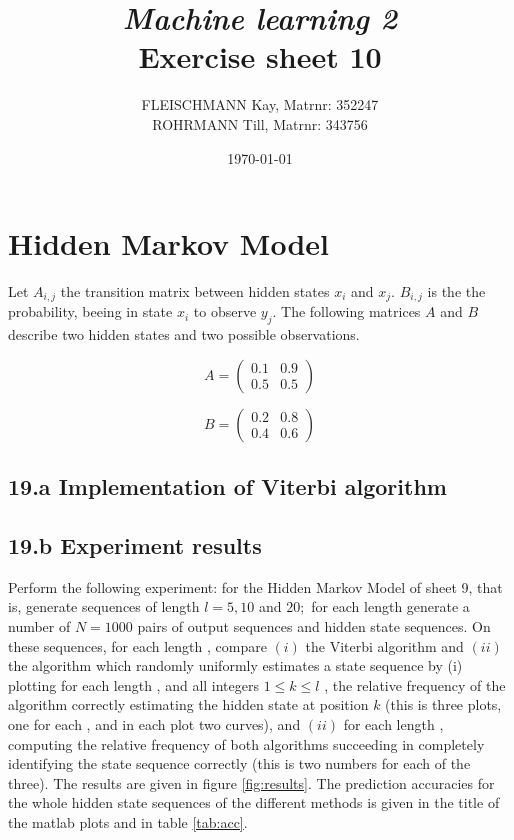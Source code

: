 \documentclass[a4paper, 12pt, titlepage]{article}
\title
{{\em Machine learning 2}\\
Exercise sheet 10}
\author{FLEISCHMANN Kay, Matrnr: 352247\\
	ROHRMANN Till, Matrnr: 343756}
\date{\today}
\begin{document}
\maketitle
\section*{Hidden Markov Model}

Let $A_{i,j}$ the transition matrix between hidden states $x_i$ and $x_j$. $B_{i,j}$ is the the probability, beeing in state $x_i$ to observe $y_j$.
The following matrices $A$ and $B$ describe two hidden states and two possible observations.

\[
A= 
 \begin{pmatrix}
  0.1 & 0.9 \\
  0.5 & 0.5
 \end{pmatrix}
\]

\[
B=
 \begin{pmatrix}
  0.2 & 0.8 \\
  0.4 & 0.6
 \end{pmatrix}
\]

\subsection*{19.a Implementation of Viterbi algorithm}
\subsection*{19.b Experiment results}

Perform the following experiment: for the Hidden Markov Model of sheet 9, that is, generate sequences of length $l= 5, 10$ and $20;$ for each length generate a number of $N = 1000$ pairs of output sequences and hidden state sequences. On these sequences, for each length , compare $(i)$ the Viterbi algorithm and $(ii)$ the algorithm which randomly uniformly estimates a state sequence by (i) plotting for each length , and all integers $1 \le k \le l$ , the relative frequency of the algorithm correctly estimating the hidden state at position $k$ (this is three plots, one for each , and in each plot two curves), and $(ii)$ for each length , computing the relative frequency of both algorithms succeeding in completely identifying the state sequence correctly (this is two numbers for each of the three). 
The results are given in figure \ref{fig:results}.
The prediction accuracies for the whole hidden state sequences of the different methods is given in the title of the matlab plots and in table \ref{tab:acc}.
\end{document}
